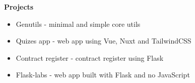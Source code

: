 {\vspace{0.5cm} \hspace{-0.5cm} \Large \textbf{Projects}}

\begin{itemize}
    \item{Genutils - minimal and simple core utils}
    \item{Quizes app - web app using Vue, Nuxt and TailwindCSS}
    \item{Contract register - contract register using Flask}
    \item {Flask-labs - web app built with Flask and no JavaScript}
\end{itemize}